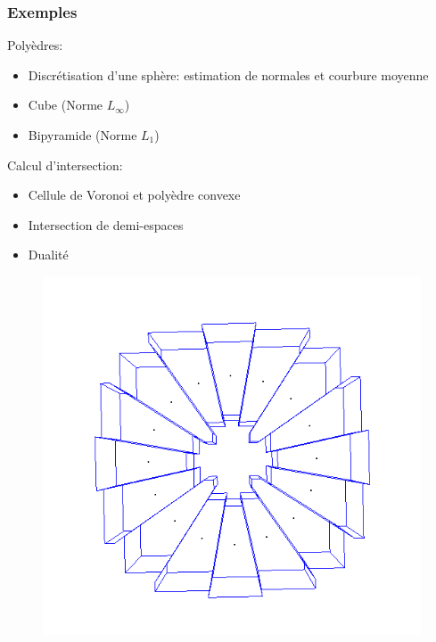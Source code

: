\documentclass{beamer}
\begin{document}
\begin{frame}
    \frametitle{Exemples}

    Polyèdres:
    \begin{itemize}
        \item Discrétisation d'une sphère: estimation de normales et courbure
            moyenne
        \item Cube (Norme $ L_{\infty} $)
        \item Bipyramide (Norme $ L_1 $)
    \end{itemize}

    Calcul d'intersection:
    \begin{itemize}
        \item Cellule de Voronoi et polyèdre convexe
        \item Intersection de demi-espaces
        \item Dualité
    \end{itemize}

    \begin{figure}
        \centering
        \includegraphics[scale=0.2]{img/circle-cube-inter}
    \end{figure}
\end{frame}
\end{document}
